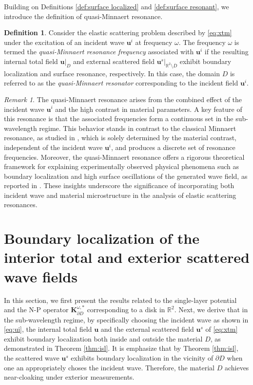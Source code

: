 \documentclass[11pt,reqno,twoside]{amsart}
\theoremstyle{definition}
\newtheorem{defn}{Definition}[section]
\theoremstyle{remark}
\newtheorem{rem}{Remark}[section]
\numberwithin{equation}{section}
\newcommand{\bu}{\mathbf{u}}
\newcommand{\bK}{\mathbf{K}}
\begin{document}
Building on  Definitions \ref{def:surface localized} and \ref{def:surface resonant}, we introduce the definition of quasi-Minnaert resonance.
\begin{defn}\label{def:quasi minnaert}
	Consider the elastic scattering problem described by \eqref{eq:xtm} under the excitation of an incident wave \( \mathbf{u}^i \) at frequency \( \omega \). The frequency \( \omega \) is termed the \textit{quasi-Minnaert resonance frequency} associated with \( \mathbf{u}^i \) if the resulting internal total field \( \mathbf{u}|_D \) and external scattered field \( \mathbf{u}^s|_{\mathbb{R}^2 \setminus \overline{D}} \) exhibit boundary localization and surface resonance, respectively. In this case, the domain \( D \) is referred to as the \textit{quasi-Minnaert resonator} corresponding to the incident field \( \mathbf{u}^i \).
\end{defn}
\begin{rem} 
	The quasi-Minnaert resonance arises from the combined effect of the incident wave \( \mathbf{u}^i \) and the high contrast in material parameters. A key feature of this resonance is that the associated frequencies form a continuous set in the sub-wavelength regime. This behavior stands in contrast to the classical Minnaert resonance, as studied in \cite{AFGL,lizou}, which is solely determined by the material contrast, independent of the incident wave \( \mathbf{u}^i \), and produces a discrete set of resonance frequencies. Moreover, the quasi-Minnaert resonance offers a rigorous theoretical framework for explaining experimentally observed physical phenomena such as boundary localization and high surface oscillations of the generated wave field, as reported in \cite{LAI, LIUCHAN, LIUZHANG}. These insights underscore the significance of incorporating both incident wave and material microstructure in the analysis of elastic scattering resonances.
\end{rem}

\section{Boundary localization  of the interior total  and exterior scattered wave fields}
\label{sec:alg}
In this section, we first present the results related to the single-layer potential and the N-P operator $\bK_{\partial D}^{\omega, *}$ corresponding to a disk in $\mathbb{R}^2$. Next, we derive that in the sub-wavelength regime, by specifically choosing the incident wave as shown in \eqref{eq:ui}, the internal total field $\bu$ and the external scattered field $\bu^{s}$ of \eqref{eq:xtm} exhibit boundary localization both inside and outside the material $D$, as demonstrated in  Theorem \ref{thm:isl}. It is emphasize that by Theorem \ref{thm:isl}, the scattered wave  $\bu^{s}$  exhibits boundary localization in the vicinity of \(\partial D\) when one an appropriately choses the  incident wave. Therefore, the material \(D\) achieves near-cloaking under exterior measurements.
\end{document}
